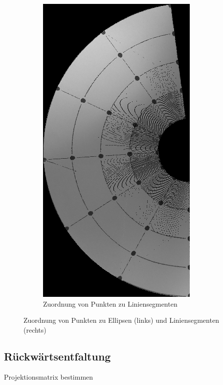 \begin{figure}[!htb]
\begin{subfigure}{.5\textwidth}
		\includegraphics[angle=-90, width=.9\textwidth]{images/coneRaspUnWarpForward.png}
		\caption{Zuordnung von Punkten zu Liniensegmenten}
		\label{fig:lineMapping}
	\end{subfigure}
	\caption{Zuordnung von Punkten zu Ellipsen (links) und Liniensegmenten (rechts)}
	\label{fig:mapping}
\end{figure}



\subsection{Rückwärtsentfaltung}
Projektionsmatrix bestimmen


